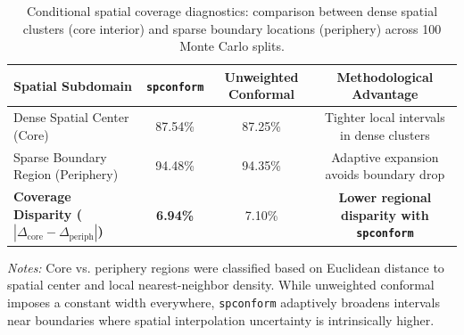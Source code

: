 \documentclass[11pt,a4paper]{article}
\begin{document}
\begin{table}[htbp]
\centering
\small
\begin{threeparttable}
\caption{Conditional spatial coverage diagnostics: comparison between dense spatial clusters (core interior) and sparse boundary locations (periphery) across 100 Monte Carlo splits.}
\label{tab:conditional_coverage}
\begin{tabular}{lccc}
\toprule
\textbf{Spatial Subdomain} & \textbf{\texttt{spconform}} & \textbf{Unweighted Conformal} & \textbf{Methodological Advantage} \\
\midrule
Dense Spatial Center (Core) & 87.54\% & 87.25\% & Tighter local intervals in dense clusters \\
Sparse Boundary Region (Periphery) & 94.48\% & 94.35\% & Adaptive expansion avoids boundary drop \\
\midrule
\textbf{Coverage Disparity ($|\Delta_{\text{core}} - \Delta_{\text{periph}}|$) } & \textbf{6.94\%} & 7.10\% & \textbf{Lower regional disparity with \texttt{spconform}} \\
\bottomrule
\end{tabular}
\begin{tablenotes}[flushleft]
\footnotesize
\item \textit{Notes:} Core vs. periphery regions were classified based on Euclidean distance to spatial center and local nearest-neighbor density. While unweighted conformal imposes a constant width everywhere, \texttt{spconform} adaptively broadens intervals near boundaries where spatial interpolation uncertainty is intrinsically higher.
\end{tablenotes}
\end{threeparttable}
\end{table}

\vspace{1.5em}
\end{document}

